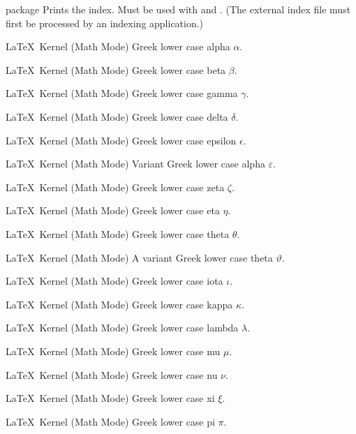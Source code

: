 %
 {}%
 { package}%
 {Prints the index. Must be used with  and .
 (The external index file must first be processed by an indexing application.)}%
 {}

%
 {}%
 {\LaTeX\ Kernel (Math Mode)}%
 {Greek lower case alpha \ensuremath{\alpha}.}%
 {}

%
 {}%
 {\LaTeX\ Kernel (Math Mode)}%
 {Greek lower case beta \ensuremath{\beta}.}%
 {}

%
 {}%
 {\LaTeX\ Kernel (Math Mode)}%
 {Greek lower case gamma \ensuremath{\gamma}.}%
 {}

%
 {}%
 {\LaTeX\ Kernel (Math Mode)}%
 {Greek lower case delta \ensuremath{\delta}.}%
 {}

%
 {}%
 {\LaTeX\ Kernel (Math Mode)}%
 {Greek lower case epsilon \ensuremath{\epsilon}.}%
 {}

%
 {}%
 {\LaTeX\ Kernel (Math Mode)}%
 {Variant Greek lower case alpha \ensuremath{\varepsilon}.}%
 {}

%
 {}%
 {\LaTeX\ Kernel (Math Mode)}%
 {Greek lower case zeta \ensuremath{\zeta}.}%
 {}

%
 {}%
 {\LaTeX\ Kernel (Math Mode)}%
 {Greek lower case eta \ensuremath{\eta}.}%
 {}

%
 {}%
 {\LaTeX\ Kernel (Math Mode)}%
 {Greek lower case theta \ensuremath{\theta}.}%
 {}

%
 {}%
 {\LaTeX\ Kernel (Math Mode)}%
 {A variant Greek lower case theta \ensuremath{\vartheta}.}%
 {}

%
 {}%
 {\LaTeX\ Kernel (Math Mode)}%
 {Greek lower case iota \ensuremath{\iota}.}%
 {}

%
 {}%
 {\LaTeX\ Kernel (Math Mode)}%
 {Greek lower case kappa \ensuremath{\kappa}.}%
 {}

%
 {}%
 {\LaTeX\ Kernel (Math Mode)}%
 {Greek lower case lambda \ensuremath{\lambda}.}%
 {}

%
 {}%
 {\LaTeX\ Kernel (Math Mode)}%
 {Greek lower case mu \ensuremath{\mu}.}%
 {}

%
 {}%
 {\LaTeX\ Kernel (Math Mode)}%
 {Greek lower case nu \ensuremath{\nu}.}%
 {}

%
 {}%
 {\LaTeX\ Kernel (Math Mode)}%
 {Greek lower case xi \ensuremath{\xi}.}%
 {}

%
 {}%
 {\LaTeX\ Kernel (Math Mode)}%
 {Greek lower case pi \ensuremath{\pi}.}%
 {}

